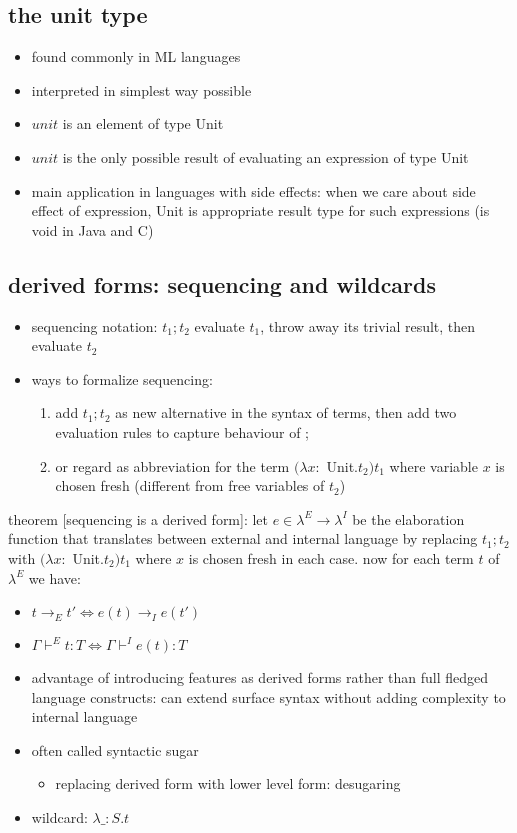 \documentclass[11pt]{article}
\begin{document}
\subsection{the unit type}
\label{sec:org4625635}
\begin{itemize}
\item found commonly in ML languages
\item interpreted in simplest way possible
\item \(unit\) is an element of type Unit
\item \(unit\) is the only possible result of evaluating an expression of type Unit
\item main application in languages with side effects: when we care about side effect of expression, Unit is appropriate result type for such expressions (is void in Java and C)
\end{itemize}

\subsection{derived forms: sequencing and wildcards}
\label{sec:orga727d74}
\begin{itemize}
\item sequencing notation: \(t_1;t_2\) evaluate \(t_1\), throw away its trivial result, then evaluate \(t_2\)
\item ways to formalize sequencing:
\begin{enumerate}
\item add \(t_1;t_2\) as new alternative in the syntax of terms, then add two evaluation rules to capture behaviour of ;
\item or regard as abbreviation for the term \((\lambda x :\) Unit.\(t_2) t_1\) where variable \(x\) is chosen fresh (different from free variables of \(t_2\))
\end{enumerate}
\end{itemize}

theorem [sequencing is a derived form]: let \(e \in \lambda^E \rightarrow \lambda^I\) be the elaboration function that translates between external and internal language by replacing \(t_1;t_2\) with \((\lambda x :\) Unit.\(t_2) t_1\) where \(x\) is chosen fresh in each case. now for each term \(t\) of \(\lambda^E\) we have:
\begin{itemize}
\item \(t \rightarrow_E t' \iff e(t) \rightarrow_I e(t')\)
\item \(\Gamma \vdash^E t:T \iff \Gamma \vdash^I e(t) : T\)

\item advantage of introducing features as derived forms rather than full fledged language constructs: can extend surface syntax without adding complexity to internal language
\item often called syntactic sugar
\begin{itemize}
\item replacing derived form with lower level form: desugaring
\end{itemize}
\item wildcard: \(\lambda\_:S.t\)
\end{itemize}
\end{document}
